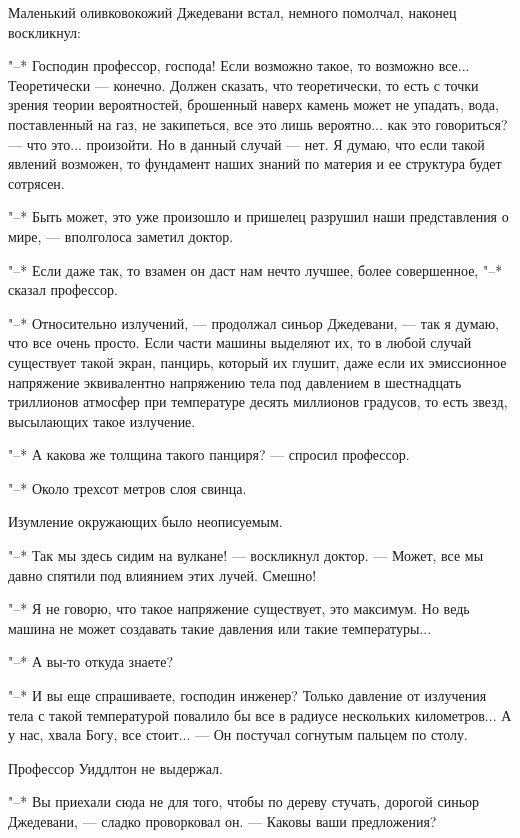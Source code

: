 Маленький оливковокожий  Джедевани  встал,  немного  помолчал,  наконец
воскликнул:

"--* Господин профессор, господа! Если возможно такое, то возможно  все...
Теоретически --- конечно. Должен сказать, что теоретически, то есть с  точки
зрения теории вероятностей, брошенный  наверх  камень  может  не  упадать,
вода, поставленный на газ, не закипеться, все это лишь вероятно... как это
говориться? --- что это... произойти. Но в данный случай --- нет. Я думаю, что
если такой явлений возможен, то фундамент наших знаний  по  материя  и  ее
структура будет сотрясен.

"--* Быть может, это уже произошло и пришелец разрушил наши  представления
о мире, --- вполголоса заметил доктор.

"--* Если даже так, то взамен он даст нам нечто лучшее, более совершенное,
"--* сказал профессор.

"--* Относительно излучений, --- продолжал синьор Джедевани, --- так я  думаю,
что все очень просто. Если части машины выделяют их,  то  в  любой  случай
существует  такой  экран,  панцирь,  который  их  глушит,  даже  если   их
эмиссионное  напряжение  эквивалентно  напряжению  тела  под  давлением  в
шестнадцать триллионов атмосфер при температуре десять миллионов градусов,
то есть звезд, высылающих такое излучение.

"--* А какова же толщина такого панциря? --- спросил профессор.

"--* Около трехсот метров слоя свинца.

Изумление окружающих было неописуемым.

"--* Так мы здесь сидим на вулкане! --- воскликнул доктор. --- Может,  все  мы
давно спятили под влиянием этих лучей. Смешно!

"--* Я не говорю, что такое напряжение существует, это максимум.  Но  ведь
машина не может создавать такие давления или такие температуры...

"--* А вы-то откуда знаете?

"--* И вы еще спрашиваете, господин инженер? Только давление от  излучения
тела  с  такой  температурой  повалило  бы  все   в   радиусе   нескольких
километров... А у нас, хвала Богу, все стоит...  ---  Он  постучал  согнутым
пальцем по столу.

Профессор Уиддлтон не выдержал.

"--* Вы приехали сюда не для того, чтобы по дереву стучать, дорогой синьор
Джедевани, --- сладко проворковал он. --- Каковы ваши предложения?

